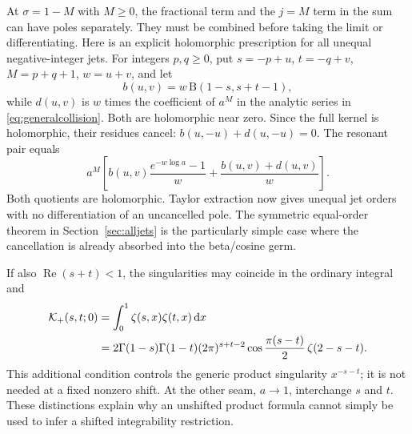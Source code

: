 \documentclass[11pt]{article}
\numberwithin{equation}{section}
\theoremstyle{definition}\newtheorem{definition}[theorem]{Definition}
\theoremstyle{remark}\newtheorem{remark}[theorem]{Remark}
\DeclareMathOperator{\Rea}{Re}
\newcommand{\dd}{\,\mathrm d}
\newcommand{\calK}{\mathcal K}
\begin{document}
At $\sigma=1-M$ with $M\ge0$, the fractional term and the $j=M$
term in the sum can have poles separately. They must be combined before
taking the limit or differentiating. Here is an explicit holomorphic
prescription for all unequal negative-integer jets. For integers $p,q\ge0$,
put $s=-p+u$, $t=-q+v$, $M=p+q+1$, $w=u+v$, and let
\[
 b(u,v)=w\,\mathrm B(1-s,s+t-1),
\]
while $d(u,v)$ is $w$ times the coefficient of $a^M$ in the analytic
series in \eqref{eq:generalcollision}. Both are holomorphic near zero.
Since the full kernel is holomorphic, their residues cancel:
$b(u,-u)+d(u,-u)=0$. The resonant pair equals
\begin{equation}\label{eq:resonantpair}
 a^M\left[
 b(u,v)\frac{e^{-w\log a}-1}{w}
               +\frac{b(u,v)+d(u,v)}w\right].
\end{equation}
Both quotients are holomorphic. Taylor extraction now gives unequal
jet orders with no differentiation of an uncancelled pole. The
symmetric equal-order theorem in Section~\ref{sec:alljets} is the
particularly simple case where the cancellation is already absorbed
into the beta/cosine germ.

If also $\Rea(s+t)<1$, the singularities may coincide in the ordinary
integral and
\begin{align}\label{eq:coincidentclassical}
 \calK_+(s,t;0)
 &=\int_0^1\zeta(s,x)\zeta(t,x)\dd x\notag\\
 &=2\Gamma(1-s)\Gamma(1-t)(2\pi)^{s+t-2}
       \cos\frac{\pi(s-t)}2\,\zeta(2-s-t).
\end{align}
This additional condition controls the generic product singularity
$x^{-s-t}$; it is not needed at a fixed nonzero shift. At the other
seam, $a\to1$, interchange $s$ and $t$. These distinctions explain why
an unshifted product formula cannot simply be used to infer a shifted
integrability restriction.
\end{document}
